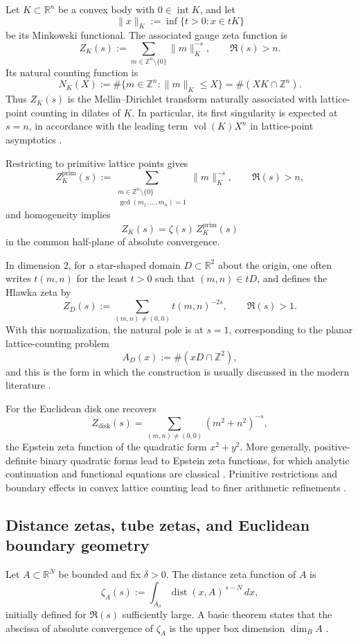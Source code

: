 \documentclass[a4paper,american,11pt]{amsart}
\theoremstyle{plain}
\theoremstyle{definition}
\begin{document}
Let \(K\subset\mathbb R^n\) be a convex body with \(0\in\operatorname{int}K\), and let
\[
\|x\|_K:=\inf\{t>0:x\in tK\}
\]
be its Minkowski functional. The associated gauge zeta function is
\[
Z_K(s):=\sum_{m\in\mathbb Z^n\setminus\{0\}} \|m\|_K^{-s},
\qquad \Re(s)>n.
\]
Its natural counting function is
\[
N_K(X):=\#\{m\in\mathbb Z^n:\|m\|_K\le X\}
       =\#(XK\cap\mathbb Z^n).
\]
Thus \(Z_K(s)\) is the Mellin--Dirichlet transform naturally associated with lattice-point counting in dilates of \(K\). In particular, its first singularity is expected at \(s=n\), in accordance with the leading term \(\operatorname{vol}(K)X^n\) in lattice-point asymptotics \cite{KratzelNowak1991,Montoro2018}.

Restricting to primitive lattice points gives
\[
Z_K^{\mathrm{prim}}(s):=
\sum_{\substack{m\in\mathbb Z^n\setminus\{0\}\\ \gcd(m_1,\dots,m_n)=1}}
\|m\|_K^{-s},
\qquad \Re(s)>n,
\]
and homogeneity implies
\[
Z_K(s)=\zeta(s)\,Z_K^{\mathrm{prim}}(s)
\]
in the common half-plane of absolute convergence.

In dimension \(2\), for a star-shaped domain \(D\subset\mathbb R^2\) about the origin, one often writes \(t(m,n)\) for the least \(t>0\) such that \((m,n)\in tD\), and defines the Hlawka zeta by
\[
Z_D(s):=\sum_{(m,n)\neq(0,0)} t(m,n)^{-2s},
\qquad \Re(s)>1.
\]
With this normalization, the natural pole is at \(s=1\), corresponding to the planar lattice-counting problem
\[
A_D(x):=\#(xD\cap\mathbb Z^2),
\]
and this is the form in which the construction is usually discussed in the modern literature \cite{Montoro2018}.

For the Euclidean disk one recovers
\[
Z_{\mathrm{disk}}(s)=\sum_{(m,n)\neq(0,0)} (m^2+n^2)^{-s},
\]
the Epstein zeta function of the quadratic form \(x^2+y^2\). More generally, positive-definite binary quadratic forms lead to Epstein zeta functions, for which analytic continuation and functional equations are classical \cite{Epstein1903}. Primitive restrictions and boundary effects in convex lattice counting lead to finer arithmetic refinements \cite{KratzelNowak2001}.

\subsection{Distance zetas, tube zetas, and Euclidean boundary geometry}

Let \(A\subset\mathbb R^N\) be bounded and fix \(\delta>0\). The distance zeta function of \(A\) is
\[
\zeta_A(s):=\int_{A_\delta} \operatorname{dist}(x,A)^{\,s-N}\,dx,
\]
initially defined for \(\Re(s)\) sufficiently large. A basic theorem states that the abscissa of absolute convergence of \(\zeta_A\) is the upper box dimension \(\overline{\dim}_B A\) \cite{LapidusRadunovicZubrinic2017JMAA,LapidusRadunovicZubrinic2017}.
\end{document}
